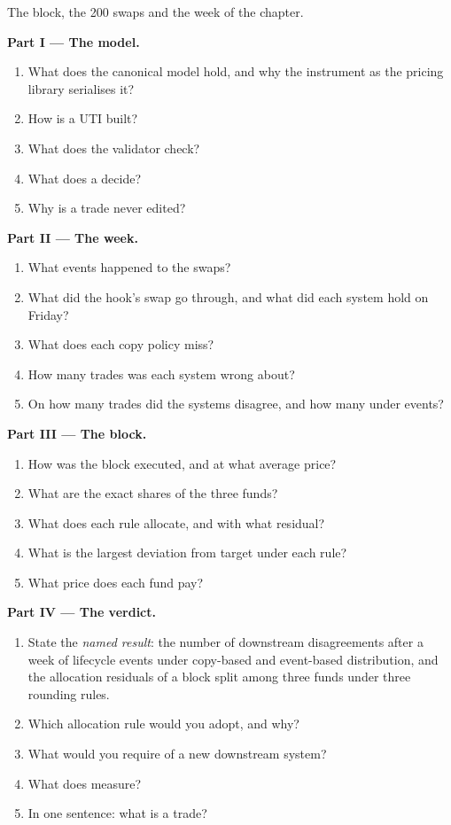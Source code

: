\begin{problem}\label{pb:pl:trade-capture-and-booking:1}
The block, the 200 swaps and the week of the chapter.

\medskip\noindent\textbf{Part I --- The model.}
\begin{enumerate}
\item What does the canonical model hold, and why the instrument as the pricing library serialises it?
\item How is a UTI built?
\item What does the validator check?
\item What does a  decide?
\item Why is a trade never edited?
\end{enumerate}

\medskip\noindent\textbf{Part II --- The week.}
\begin{enumerate}[resume]
\item What events happened to the swaps?
\item What did the hook's swap go through, and what did each system hold on Friday?
\item What does each copy policy miss?
\item How many trades was each system wrong about?
\item On how many trades did the systems disagree, and how many under events?
\end{enumerate}

\medskip\noindent\textbf{Part III --- The block.}
\begin{enumerate}[resume]
\item How was the block executed, and at what average price?
\item What are the exact shares of the three funds?
\item What does each rule allocate, and with what residual?
\item What is the largest deviation from target under each rule?
\item What price does each fund pay?
\end{enumerate}

\medskip\noindent\textbf{Part IV --- The verdict.}
\begin{enumerate}[resume]
\item State the \emph{named result}: the number of downstream disagreements after a week of lifecycle events under copy-based and event-based
distribution, and the allocation residuals of a block split among three funds under three rounding rules.
\item Which allocation rule would you adopt, and why?
\item What would you require of a new downstream system?
\item What does  measure?
\item In one sentence: what is a trade?
\end{enumerate}
\end{problem}

